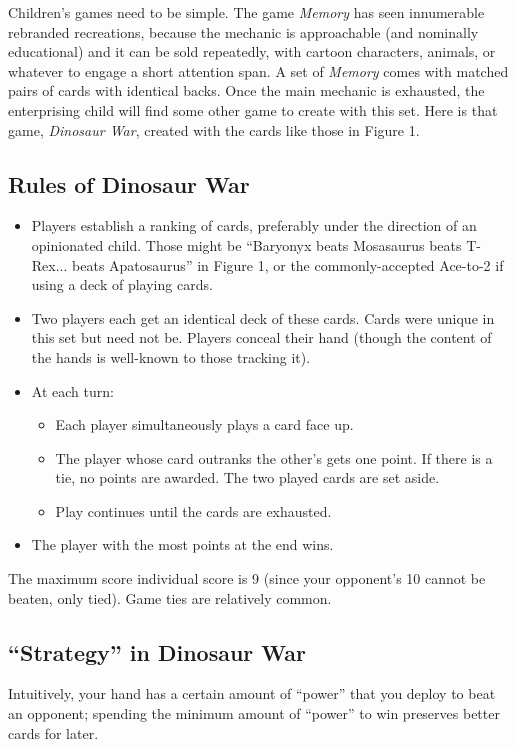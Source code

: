 \documentclass[11pt, oneside]{article} 	%
\begin{document}
Children's games need to be simple. The game \emph{Memory} has seen innumerable rebranded recreations, because the mechanic is approachable (and nominally educational) and it can be sold repeatedly, with cartoon characters, animals, or whatever to engage a short attention span. A set of \emph{Memory} comes with matched pairs of cards with identical backs. Once the main mechanic is exhausted, the enterprising child will find some other game to create with this set. Here is that game, \emph{Dinosaur War}, created with the cards like those in Figure 1.

\subsection{Rules of Dinosaur War}

\begin{itemize} 
\item Players establish a ranking of cards, preferably under the direction of an opinionated child. Those might be ``Baryonyx beats Mosasaurus beats T-Rex... beats Apatosaurus'' in Figure 1, or the commonly-accepted Ace-to-2 if using a deck of playing cards.
\item Two players each get an identical deck of these cards. Cards were unique in this set but need not be. Players conceal their hand (though the content of the hands is well-known to those tracking it).
\item At each turn:
\begin{itemize}
\item Each player simultaneously plays a card face up.
\item The player whose card outranks the other's gets one point. If there is a tie, no points are awarded. The two played cards are set aside.
\item Play continues until the cards are exhausted.
\end{itemize}
\item The player with the most points at the end wins.
\end{itemize}

The maximum score individual score is 9 (since your opponent's 10 cannot be beaten, only tied). Game ties are relatively common. 

\subsection{``Strategy'' in Dinosaur War}

Intuitively, your hand has a certain amount of ``power'' that you deploy to beat an opponent; spending the minimum amount of ``power'' to win preserves better cards for later. 
\end{document}
